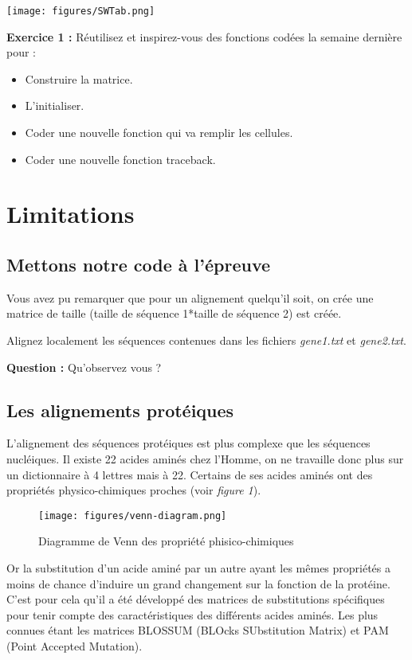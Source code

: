 \documentclass{article}
\begin{document}
\begin{center}
\texttt{[image: figures/SWTab.png]}
\end{center}

\textbf{Exercice 1 :}
Réutilisez et inspirez-vous des fonctions codées la semaine dernière pour :
\begin{itemize}
\item Construire la matrice.
\item L'initialiser.
\item Coder une nouvelle fonction qui va remplir les cellules.
\item Coder une nouvelle fonction traceback.
\end{itemize}

\newpage
	\section{Limitations}
    \subsection{Mettons notre code à l'épreuve}
    
Vous avez pu remarquer que pour un alignement quelqu'il soit, on crée une matrice de taille (taille de séquence 1*taille de séquence 2) est créée.

Alignez localement les séquences contenues dans les fichiers \textit{gene1.txt} et \textit{gene2.txt}.


    \textbf{Question :} Qu'observez vous ?
    
	\subsection{Les alignements protéiques}
	
L'alignement des séquences protéiques est plus complexe que les séquences nucléiques. Il existe 22 acides aminés chez l'Homme, on ne travaille donc plus sur un dictionnaire à 4 lettres mais à 22. Certains de ses acides aminés ont des propriétés physico-chimiques proches (voir \textit{figure 1}). 


\begin{figure}[H]
  \centering
      \texttt{[image: figures/venn-diagram.png]}
  \caption{Diagramme de Venn des propriété phisico-chimiques}
\end{figure}


Or la substitution d'un acide aminé par un autre ayant les mêmes propriétés a moins de chance d'induire un grand changement sur la fonction de la protéine. C'est pour cela qu'il a été développé des matrices de substitutions spécifiques pour tenir compte des caractéristiques des différents acides aminés. Les plus connues étant les matrices BLOSSUM (BLOcks SUbstitution Matrix) et PAM (Point Accepted Mutation).
\end{document}

